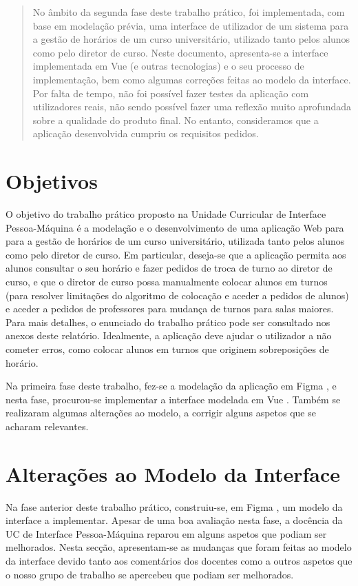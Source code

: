 \documentclass[12pt, a4paper]{article}
\begin{document}
\begin{abstract}
    \noindent
    No âmbito da segunda fase deste trabalho prático, foi implementada, com base em modelação
    prévia, uma interface de utilizador de um sistema para a gestão de horários de um curso
    universitário, utilizado tanto pelos alunos como pelo diretor de curso. Neste documento,
    apresenta-se a interface implementada em Vue \cite{vue} (e outras tecnologias) e o seu processo
    de implementação, bem como algumas correções feitas ao modelo da interface. Por falta de tempo,
    não foi possível fazer testes da aplicação com utilizadores reais, não sendo possível fazer uma
    reflexão muito aprofundada sobre a qualidade do produto final. No entanto, consideramos que a
    aplicação desenvolvida cumpriu os requisitos pedidos.
\end{abstract}

\section{Objetivos}

O objetivo do trabalho prático proposto na Unidade Curricular de Interface Pessoa-Máquina é a
modelação e o desenvolvimento de uma aplicação Web para para a gestão de horários de um curso
universitário, utilizada tanto pelos alunos como pelo diretor de curso. Em particular, deseja-se que
a aplicação permita aos alunos consultar o seu horário e fazer pedidos de troca de turno ao diretor
de curso, e que o diretor de curso possa manualmente colocar alunos em turnos (para resolver
limitações do algoritmo de colocação e aceder a pedidos de alunos) e aceder a pedidos de professores
para mudança de turnos para salas maiores. Para mais detalhes, o enunciado do trabalho prático pode
ser consultado nos anexos deste relatório. Idealmente, a aplicação deve ajudar o utilizador a não
cometer erros, como colocar alunos em turnos que originem sobreposições de horário.

Na primeira fase deste trabalho, fez-se a modelação da aplicação em Figma \cite{figma}, e nesta
fase, procurou-se implementar a interface modelada em Vue \cite{vue}. Também se realizaram algumas
alterações ao modelo, a corrigir alguns aspetos que se acharam relevantes.

\section{Alterações ao Modelo da Interface}

Na fase anterior deste trabalho prático, construiu-se, em Figma \cite{figma}, um modelo da interface
a implementar. Apesar de uma boa avaliação nesta fase, a docência da UC de Interface Pessoa-Máquina
reparou em alguns aspetos que podiam ser melhorados. Nesta secção, apresentam-se as mudanças que
foram feitas ao modelo da interface devido tanto aos comentários dos docentes como a outros aspetos
que o nosso grupo de trabalho se apercebeu que podiam ser melhorados.
\end{document}

